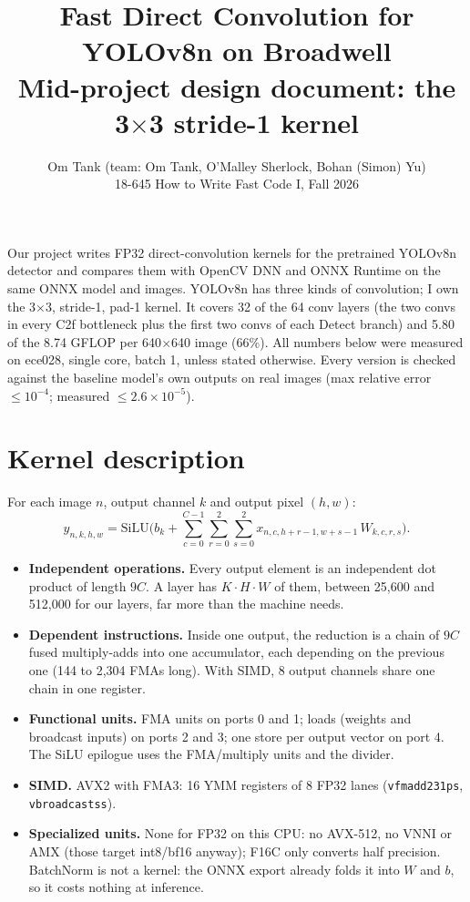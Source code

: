 \documentclass[10pt]{article}
\title{\vspace{-1.6em}\textbf{Fast Direct Convolution for YOLOv8n on Broadwell}\\[2pt]
\large Mid-project design document: the 3$\times$3 stride-1 kernel}
\author{Om Tank \quad (team: Om Tank, O'Malley Sherlock, Bohan (Simon) Yu)\\
18-645 How to Write Fast Code I, Fall 2026}
\date{\vspace{-1.2em}}
\newcommand{\code}[1]{\texttt{#1}}
\begin{document}
\maketitle

\noindent Our project writes FP32 direct-convolution kernels for the pretrained YOLOv8n detector and compares them with OpenCV DNN and ONNX Runtime on the same ONNX model and images. YOLOv8n has three kinds of convolution; I own the 3$\times$3, stride-1, pad-1 kernel. It covers 32 of the 64 conv layers (the two convs in every C2f bottleneck plus the first two convs of each Detect branch) and 5.80 of the 8.74 GFLOP per 640$\times$640 image (66\%). All numbers below were measured on ece028, single core, batch 1, unless stated otherwise. Every version is checked against the baseline model's own outputs on real images (max relative error $\le 10^{-4}$; measured $\le 2.6\times10^{-5}$).

\section{Kernel description}
For each image $n$, output channel $k$ and output pixel $(h,w)$:
\[ y_{n,k,h,w} = \mathrm{SiLU}\Big(b_k + \textstyle\sum_{c=0}^{C-1}\sum_{r=0}^{2}\sum_{s=0}^{2} x_{n,c,h+r-1,w+s-1}\, W_{k,c,r,s}\Big). \]
\begin{itemize}
\item \textbf{Independent operations.} Every output element is an independent dot product of length $9C$. A layer has $K\cdot H\cdot W$ of them, between 25{,}600 and 512{,}000 for our layers, far more than the machine needs.
\item \textbf{Dependent instructions.} Inside one output, the reduction is a chain of $9C$ fused multiply-adds into one accumulator, each depending on the previous one (144 to 2{,}304 FMAs long). With SIMD, 8 output channels share one chain in one register.
\item \textbf{Functional units.} FMA units on ports 0 and 1; loads (weights and broadcast inputs) on ports 2 and 3; one store per output vector on port 4. The SiLU epilogue uses the FMA/multiply units and the divider.
\item \textbf{SIMD.} AVX2 with FMA3: 16 YMM registers of 8 FP32 lanes (\code{vfmadd231ps}, \code{vbroadcastss}).
\item \textbf{Specialized units.} None for FP32 on this CPU: no AVX-512, no VNNI or AMX (those target int8/bf16 anyway); F16C only converts half precision. BatchNorm is not a kernel: the ONNX export already folds it into $W$ and $b$, so it costs nothing at inference.
\end{itemize}
\end{document}

